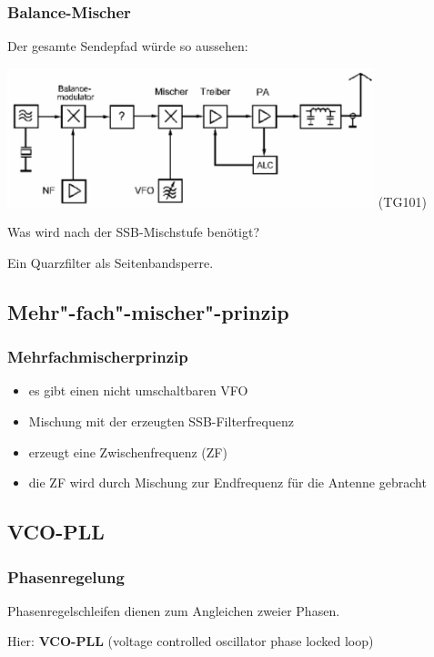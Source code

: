 \begin{frame}
  \frametitle{Balance-Mischer}

  Der gesamte Sendepfad würde so aussehen:

  \begin{center}
    \includegraphics[width=0.8\textwidth,height=.5\textheight,keepaspectratio]{a13/TG101.png}
    {\tiny (TG101)}
  \end{center}

  Was wird nach der SSB-Mischstufe benötigt?
  \vspace{2em}
  \pause

  Ein Quarzfilter als Seitenbandsperre.

\end{frame}

\subsection{Mehr"-fach"-mischer"-prinzip}
\begin{frame}
  \frametitle{Mehrfachmischerprinzip}
  \begin{itemize}
    \item es gibt einen nicht umschaltbaren VFO
    \item Mischung mit der erzeugten SSB-Filterfrequenz
    \item erzeugt eine Zwischenfrequenz (ZF)
    \item die ZF wird durch Mischung zur Endfrequenz für die Antenne gebracht
  \end{itemize}
\end{frame}

\subsection{VCO-PLL}

\begin{frame}
  \frametitle{Phasenregelung}

  Phasenregelschleifen dienen zum Angleichen zweier Phasen.

  \bigskip

  Hier: \textbf{VCO-PLL} (voltage controlled oscillator phase locked loop)

\end{frame}

